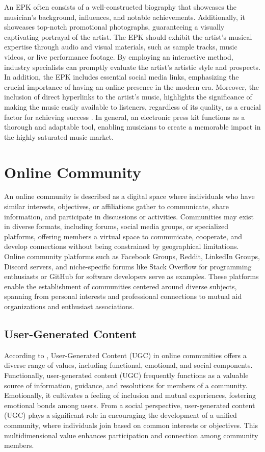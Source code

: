 An EPK often consists of a well-constructed biography that showcases the musician's background, influences, and notable achievements. Additionally, it showcases top-notch promotional photographs, guaranteeing a visually captivating portrayal of the artist. The EPK should exhibit the artist's musical expertise through audio and visual materials, such as sample tracks, music videos, or live performance footage. By employing an interactive method, industry specialists can promptly evaluate the artist's artistic style and prospects. In addition, the EPK includes essential social media links, emphasizing the crucial importance of having an online presence in the modern era. Moreover, the inclusion of direct hyperlinks to the artist's music, highlights the significance of making the music easily available to listeners, regardless of its quality, as a crucial factor for achieving success \parencite{wilson20}. In general, an electronic press kit functions as a thorough and adaptable tool, enabling musicians to create a memorable impact in the highly saturated music market.

\section{Online Community}
An online community is described as a digital space where individuals who have similar interests, objectives, or affiliations gather to communicate, share information, and participate in discussions or activities. Communities may exist in diverse formats, including forums, social media groups, or specialized platforms, offering members a virtual space to communicate, cooperate, and develop connections without being constrained by geographical limitations. Online community platforms such as Facebook Groups, Reddit, LinkedIn Groups, Discord servers, and niche-specific forums like Stack Overflow for programming enthusiasts or GitHub for software developers serve as examples. These platforms enable the establishment of communities centered around diverse subjects, spanning from personal interests and professional connections to mutual aid organizations and enthusiast associations. \pagebreak

\subsection{User-Generated Content}
According to \textcite{v22}, User-Generated Content (UGC) in online communities offers a diverse range of values, including functional, emotional, and social components. Functionally, user-generated content (UGC) frequently functions as a valuable source of information, guidance, and resolutions for members of a community. Emotionally, it cultivates a feeling of inclusion and mutual experiences, fostering emotional bonds among users. From a social perspective, user-generated content (UGC) plays a significant role in encouraging the development of a unified community, where individuals join based on common interests or objectives. This multidimensional value enhances participation and connection among community members. \\

